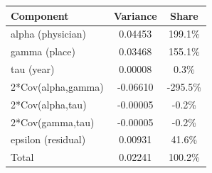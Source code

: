 
\begin{tabular}{lcc}
\toprule
Component & Variance & Share\\
\midrule
alpha (physician) & 0.04453 & 199.1\%\\
gamma (place) & 0.03468 & 155.1\%\\
tau (year) & 0.00008 & 0.3\%\\
2*Cov(alpha,gamma) & -0.06610 & -295.5\%\\
2*Cov(alpha,tau) & -0.00005 & -0.2\%\\
2*Cov(gamma,tau) & -0.00005 & -0.2\%\\
epsilon (residual) & 0.00931 & 41.6\%\\
Total & 0.02241 & 100.2\%\\
\bottomrule
\end{tabular}

